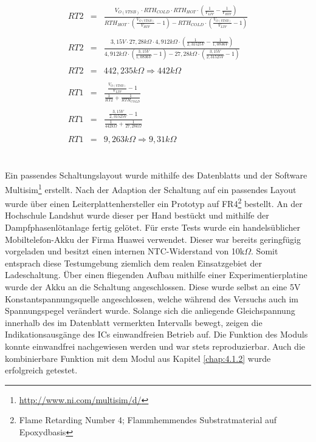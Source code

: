 \documentclass[12pt]{scrreprt} %
\begin{document}
\begin{eqnarray}
RT2&=&\frac{V_{O(VTSB)} \cdot RTH_{COLD} \cdot RTH_{HOT} \cdot \left( \frac{1}{V_{LTF}}-\frac{1}{V_{HTF}}\right)}{RTH_{HOT} \cdot \left( \frac{V_{O(VTSB)}}{V_{HTF}}-1\right)-RTH_{COLD} \cdot \left( \frac{V_{O(VTSB)}}{V_{LTF}}-1 \right)}\\
\nonumber\\
RT2&=&\frac{3,15V \cdot 27,28k\Omega \cdot4,912k\Omega \cdot \left( \frac{1}{2,31525V}-\frac{1}{1,0836V}\right)}{4,912k\Omega \cdot \left( \frac{3,15V}{1,0836V}-1\right)-27,28k\Omega \cdot \left( \frac{3,15V}{2,31525V}-1 \right)}\\
\nonumber\\
RT2&=& 442,235 k \Omega \Rightarrow 442k \Omega\\
\nonumber\\
RT1&=&\frac{\frac{V_{O(VTSB)}}{V_{LTF}}-1}{\frac{1}{RT2}+\frac{1}{RTH_{COLD}}}\\
\nonumber\\
RT1&=&\frac{\frac{3,15V}{2,31525V}-1}{\frac{1}{442k \Omega}+\frac{1}{27,28k\Omega}}\\
\nonumber\\
RT1&=&9,263k\Omega \Rightarrow 9,31k\Omega
\end{eqnarray}
\\
\\
Ein passendes Schaltungslayout wurde mithilfe des Datenblatts \citep{BQ24100} und der Software Multisim\footnote{\url{http://www.ni.com/multisim/d/}} erstellt. Nach der Adaption der Schaltung auf ein passendes Layout wurde über einen Leiterplattenhersteller ein Prototyp auf FR4\footnote{Flame Retarding Number 4; Flammhemmendes Substratmaterial auf Epoxydbasis} bestellt. An der Hochschule Landshut wurde dieser per Hand bestückt und mithilfe der Dampfphasenlötanlage fertig gelötet. Für erste Tests wurde ein handelsüblicher Mobiltelefon-Akku der Firma Huawei verwendet. Dieser war bereits geringfügig vorgeladen und besitzt einen internen NTC-Widerstand von 10k$\Omega$. Somit entsprach diese Testumgebung ziemlich dem realen Einsatzgebiet der Ladeschaltung. Über einen fliegenden Aufbau mithilfe einer Experimentierplatine wurde der Akku an die Schaltung angeschlossen. Diese wurde selbst an eine 5V Konstantspannungsquelle angeschlossen, welche während des Versuchs auch im Spannungspegel verändert wurde. Solange sich die anliegende Gleichspannung innerhalb des im Datenblatt vermerkten Intervalls bewegt, zeigen die Indikationsausgänge des ICs einwandfreien Betrieb auf. Die Funktion des Moduls konnte einwandfrei nachgewiesen werden und war stets reproduzierbar. Auch die kombinierbare Funktion mit dem Modul aus Kapitel \vref{chap:4.1.2} wurde erfolgreich getestet.
\end{document}
